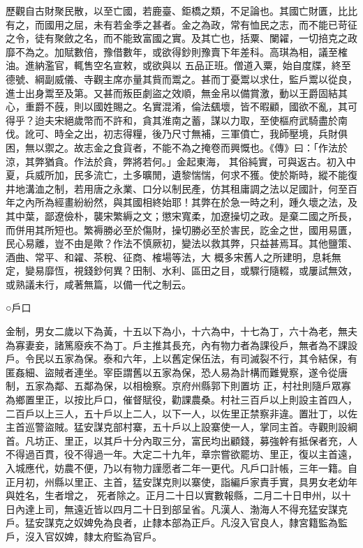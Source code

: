 \begin{pinyinscope}
 歷觀自古財聚民散，以至亡國，若鹿臺、鉅橋之類，不足論也。其國亡財匱，比比有之，而國用之屈，未有若金季之甚者。金之為政，常有恤民之志，而不能已苛征之令，徒有聚斂之名，而不能致富國之實。及其亡也，括粟、闌糴，一切掊克之政靡不為之。加賦數倍，豫借數年，或欲得鈔則豫賣下年差科。高琪為相，議至榷油。進納濫官，輒售空名宣敕，或欲與以
 五品正班。僧道入粟，始自度牒，終至德號、綱副威儀、寺觀主席亦量其貲而鬻之。甚而丁憂鬻以求仕，監戶鬻以從良，進士出身鬻至及第。又甚而叛臣劇盜之效順，無金帛以備賞激，動以王爵固結其心，重爵不蔇，則以國姓賜之。名實混淆，倫法颻壞，皆不暇顧，國欲不亂，其可得乎？迨夫宋絕歲幣而不許和，貪其淮南之蓄，謀以力取，至使樞府武騎盡於南伐。訛可、時全之出，初志得糧，後乃尺寸無補，三軍僨亡，我師壓境，兵財俱困，無以禦之。故志金之食貨者，不能不為之掩卷而興慨也。《傳》曰：「作法於涼，其弊猶貪。作法於貪，弊將若何。」金起東海，
 其俗純實，可與返古。初入中夏，兵威所加，民多流亡，土多曠閒，遺黎惴惴，何求不獲。使於斯時，縱不能復井地溝洫之制，若用唐之永業、口分以制民產，仿其租庸調之法以足國計，何至百年之內所為經畫紛紛然，與其國相終始耶！其弊在於急一時之利，踵久壞之法，及其中葉，鄙遼儉朴，襲宋繁縟之文；懲宋寬柔，加遼操切之政。是棄二國之所長，而併用其所短也。繁褥勝必至於傷財，操切勝必至於害民，訖金之世，國用易匱，民心易離，豈不由是歟？作法不慎厥初，變法以救其弊，只益甚焉耳。其他鹽策、酒曲、常平、和糴、茶稅、征商、榷場等法，大
 概多宋舊人之所建明，息耗無定，變易靡恆，視錢鈔何異？田制、水利、區田之目，或驟行隨輟，或屢試無效，或熟議未行，咸著無篇，以備一代之制云。



 ○戶口



 金制，男女二歲以下為黃，十五以下為小，十六為中，十七為丁，六十為老，無夫為寡妻妾，諸篤廢疾不為丁。戶主推其長充，內有物力者為課役戶，無者為不課設戶。令民以五家為保。泰和六年，上以舊定保伍法，有司滅裂不行，其令結保，有匿姦細、盜賊者連坐。宰臣謂舊以五家為保，恐人易為計構而難覺察，遂令從唐制，五家為鄰、五鄰為保，以相檢察。京府州縣郭下則置坊
 正，村社則隨戶眾寡為鄉置里正，以按比戶口，催督賦役，勸課農桑。村社三百戶以上則設主首四人，二百戶以上三人，五十戶以上二人，以下一人，以佐里正禁察非違。置壯丁，以佐主首巡警盜賊。猛安謀克部村寨，五十戶以上設寨使一人，掌同主首。寺觀則設綱首。凡坊正、里正，以其戶十分內取三分，富民均出顧錢，募強幹有抵保者充，人不得過百貫，役不得過一年。大定二十九年，章宗嘗欲罷坊、里正，復以主首遠，入城應代，妨農不便，乃以有物力謹愿者二年一更代。凡戶口計帳，三年一籍。自正月初，州縣以里正、主首，猛安謀克則以寨使，詣編戶家責手實，具男女老幼年與姓名，生者增之，
 死者除之。正月二十日以實數報縣，二月二十日申州，以十日內達上司，無遠近皆以四月二十日到部呈省。凡漢人、渤海人不得充猛安謀克戶。猛安謀克之奴婢免為良者，止隸本部為正戶。凡沒入官良人，隸宮籍監為監戶，沒入官奴婢，隸太府監為官戶。




\end{pinyinscope}

